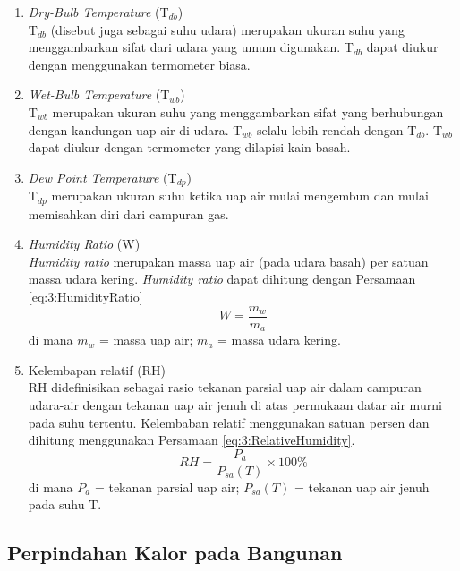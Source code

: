 \begin{enumerate}
	\item \textit{Dry-Bulb Temperature} (T$_{db}$) \\
	T$_{db}$ (disebut juga sebagai suhu udara) merupakan ukuran suhu yang menggambarkan sifat dari udara yang umum digunakan. T$_{db}$ dapat diukur dengan menggunakan termometer biasa.
	
	\item \textit{Wet-Bulb Temperature} (T$_{wb}$) \\
	T$_{wb}$ merupakan ukuran suhu yang menggambarkan sifat yang berhubungan dengan kandungan uap air di udara. T$_{wb}$ selalu lebih rendah dengan T$_{db}$. T$_{wb}$ dapat diukur dengan termometer yang dilapisi kain basah.
	
	\item \textit{Dew Point Temperature} (T$_{dp}$) \\
	T$_{dp}$ merupakan ukuran suhu ketika uap air mulai mengembun dan mulai memisahkan diri dari campuran gas.
	
	\item \textit{Humidity Ratio} (W)\\
	\textit{Humidity ratio} merupakan massa uap air (pada udara basah) per satuan massa udara kering. \textit{Humidity ratio} dapat dihitung dengan Persamaan \ref{eq:3:HumidityRatio}\\
	\begin{equation} \label{eq:3:HumidityRatio}
		W = \frac{m_w}{m_a} 
	\end{equation}
	di mana $m_w$ = massa uap air; $m_a$ = massa udara kering.
	
	\item Kelembapan relatif (RH) \\
	RH didefinisikan sebagai rasio tekanan parsial uap air dalam campuran udara-air dengan tekanan uap air jenuh di atas permukaan datar air murni pada suhu tertentu. Kelembaban relatif menggunakan satuan persen dan dihitung menggunakan Persamaan \ref{eq:3:RelativeHumidity}.
	\begin{equation} \label{eq:3:RelativeHumidity}
	RH = \frac{P_a}{P_{sa}(T)} \times 100\% 
	\end{equation}
	di mana $P_a$ = tekanan parsial uap air; $P_{sa}(T)$ = tekanan uap air jenuh pada suhu T.
\end{enumerate}

\subsection{Perpindahan Kalor pada Bangunan}

